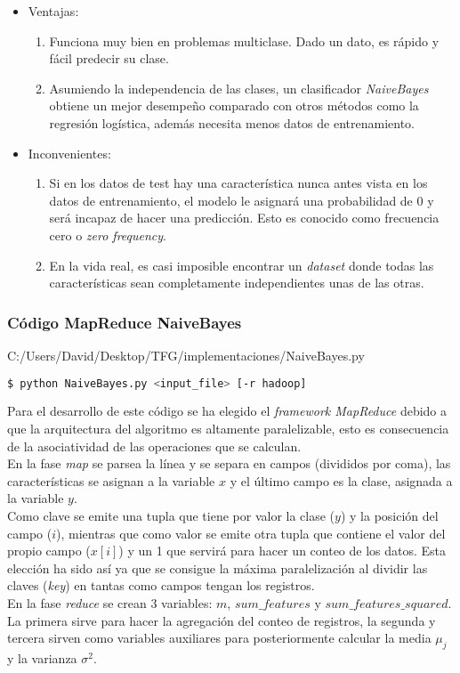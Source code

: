 \begin{itemize}
  \item Ventajas:
  \begin{enumerate}
    \item Funciona muy bien en problemas multiclase. Dado un dato, es rápido y fácil predecir su clase.
    \item Asumiendo la independencia de las clases, un clasificador \textit{NaiveBayes} obtiene un mejor 
    desempeño comparado con otros métodos como la regresión logística, además necesita menos datos 
    de entrenamiento.
  \end{enumerate}
  \item Inconvenientes:
  \begin{enumerate}
    \item Si en los datos de test hay una característica nunca antes vista en los datos de 
    entrenamiento, el modelo le asignará una probabilidad de 0 y será incapaz de hacer una predicción.
    Esto es conocido como frecuencia cero o \textit{zero frequency}.
    \item En la vida real, es casi imposible encontrar un \textit{dataset} donde todas las características 
    sean completamente independientes unas de las otras.
  \end{enumerate}
\end{itemize}

\subsubsection*{Código MapReduce NaiveBayes}

                {C:/Users/David/Desktop/TFG/implementaciones/NaiveBayes.py}
                  
\begin{lstlisting}[language=bash, numbers=none]
$ python NaiveBayes.py <input_file> [-r hadoop]
\end{lstlisting}

Para el desarrollo de este código se ha elegido el \textit{framework MapReduce} debido a que la arquitectura del
algoritmo es altamente paralelizable, esto es consecuencia de la asociatividad de las operaciones que se calculan.\\
En la fase \textit{map} se parsea la línea y se separa en campos (divididos por coma), las características se 
asignan a la variable $x$ y el último campo es la clase, asignada a la variable $y$.\\
Como clave se emite una tupla que tiene por valor la clase ($y$) y la posición del campo ($i$), mientras que
como valor se emite otra tupla que contiene el valor del propio campo ($x[i]$) y un 1 que servirá para hacer
un conteo de los datos. Esta elección ha sido así ya que se consigue la máxima paralelización al dividir las 
claves (\textit{key}) en tantas como campos tengan los registros.\\
En la fase \textit{reduce} se crean 3 variables: $m$, $sum\_features$ y $sum\_features\_squared$. La primera sirve
para hacer la agregación del conteo de registros, la segunda y tercera sirven como variables auxiliares para 
posteriormente calcular la media $\mu_j$ y la varianza $\sigma^2$.
                    
\clearpage